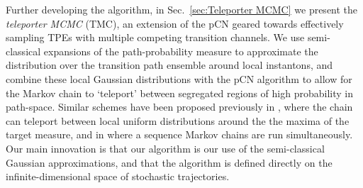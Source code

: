 Further developing the algorithm, in Sec.~\ref{sec:Teleporter MCMC} we present the \textit{teleporter MCMC} (TMC), an extension of the pCN geared towards effectively sampling TPEs with multiple competing transition channels. We use semi-classical expansions \citep{chaichianPathIntegralsPhysics2001, schulmanTechniquesApplicationsPath1996, smirnovEstimationPathIntegral2010, moretteDefinitionApproximationFeynman1951, marinovPathIntegralsQuantum1980, sakuraiModernQuantumMechanics2017} of the path-probability measure to approximate the distribution over the transition path ensemble around local instantons, and combine these local Gaussian distributions with the pCN algorithm to allow for the Markov chain to `teleport' between segregated regions of high probability in path-space. Similar schemes have been proposed previously in \citep{sminchisescuModeHoppingMCMCSampler}, where the chain can teleport between local uniform distributions around the the maxima of the target measure, and in \citep{lindseyEnsembleMarkovChain2021} where a sequence Markov chains are run simultaneously. Our main innovation is that our algorithm is our use of the semi-classical Gaussian approximations, and that the algorithm is defined directly on the infinite-dimensional space of stochastic trajectories.

